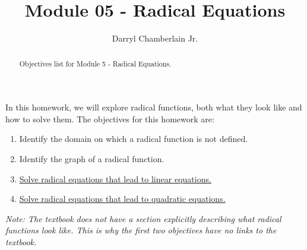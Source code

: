 \documentclass{ximera}
\author{Darryl Chamberlain Jr.}
\title{Module 05 - Radical Equations}
\begin{document}
\begin{abstract}
Objectives list for Module 5 - Radical Equations.
\end{abstract}
\maketitle

In this homework, we will explore radical functions, both what they look like and how to solve them.  
The objectives for this homework are: 
\begin{enumerate}
	\item Identify the domain on which a radical function is not defined.
    \item Identify the graph of a radical function.
	\item \href{https://cnx.org/contents/mwjClAV_@8.1:uI1As6DV@15/Other-Types-of-Equations}{Solve radical equations that lead to linear equations.}
	\item \href{https://cnx.org/contents/mwjClAV_@8.1:uI1As6DV@15/Other-Types-of-Equations}{Solve radical equations that lead to quadratic equations.} 
\end{enumerate}

\textit{Note: The textbook does not have a section explicitly describing what radical functions look like. This is why the first two objectives have no links to the textbook.}
\end{document}
